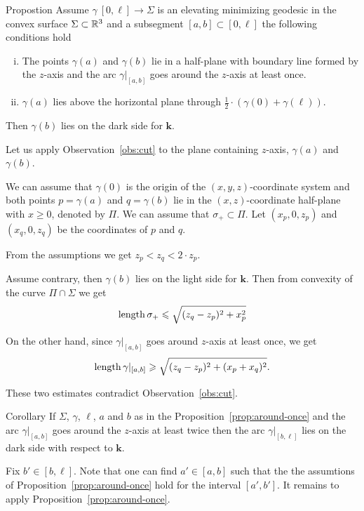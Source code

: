 \documentclass[a4paper,10pt]{amsart}
\begin{document}
\begin{thm}{Propostion}\label{prop:around-once}
Assume $\gamma\:[0,\ell]\to \Sigma$ is an elevating minimizing geodesic in the convex surface $\Sigma\subset \mathbb{R}^3$ and a subsegment $[a,b]\subset [0,\ell]$ the following conditions hold
\begin{enumerate}[(i)]
\item The points $\gamma(a)$ and $\gamma(b)$ lie in a half-plane with boundary line formed by the $z$-axis
and  the arc $\gamma|_{[a,b]}$ goes around the $z$-axis at least once.
\item $\gamma(a)$ lies above the horizontal plane through $\tfrac12\cdot(\gamma(0)+\gamma(\ell))$.
\end{enumerate}
Then  $\gamma(b)$ lies on the dark side for $\bm{k}$.
\end{thm}

Let us apply Observation~\ref{obs:cut} to the plane containing $z$-axis, $\gamma(a)$ and $\gamma(b)$.


We can assume that $\gamma(0)$ is the origin of the $(x,y,z)$-coordinate system
and both points $p=\gamma(a)$ and $q=\gamma(b)$ lie in the $(x,z)$-coordinate half-plane with $x\ge 0$, denoted by $\Pi$.
We can assume that $\sigma_+\subset \Pi$.
Let $(x_p,0,z_p)$ and $(x_q,0,z_q)$ be the coordinates of $p$ and $q$.

From the assumptions we get $z_p<z_q<2\cdot z_p$.

Assume contrary,
then $\gamma(b)$ lies on the light side for $\bm{k}$.
Then from convexity of the curve $\Pi\cap \Sigma$
we get 
\[\mathop{\rm length}\nolimits\sigma_+\leqslant \sqrt{(z_q-z_p)^2+x_p^2}\]

On the other hand, since $\gamma|_{[a,b]}$ goes around $z$-axis at least once,
we get 
\[\mathop{\rm length}\nolimits\gamma|_{[a,b]}\geqslant \sqrt{(z_q-z_p)^2+(x_p+x_q)^2}.\]

These two estimates contradict Observation~\ref{obs:cut}.
\qeds

\begin{thm}{Corollary}\label{cor:around-twice}
If $\Sigma$, $\gamma$, $\ell$, $a$ and $b$ as in the Proposition~\ref{prop:around-once} and the arc $\gamma|_{[a,b]}$ goes around the $z$-axis at least twice
then the arc $\gamma|_{[b,\ell]}$ lies on the dark side with respect to $\bm{k}$.
\end{thm}

Fix $b'\in [b,\ell]$.
Note that one can find $a'\in [a,b]$ such that the the assumtions of Proposition~\ref{prop:around-once} hold for the interval $[a',b']$. 
It remains to apply Proposition~\ref{prop:around-once}.
\qeds 
\end{document}
